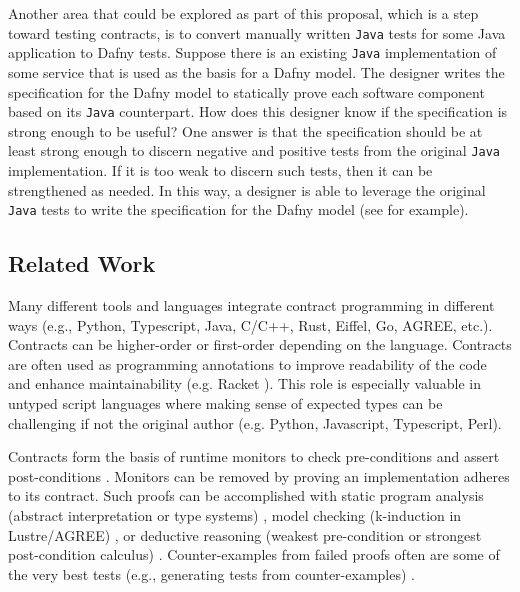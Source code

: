 \documentclass[11pt,onecolumn,notitlepage]{article}
\begin{document}
Another area that could be explored as part of this proposal, which is a step toward testing contracts, is to convert manually written \texttt{Java} tests for some Java application to Dafny tests. Suppose there is an existing \texttt{Java} implementation of some service that is used as the basis for a Dafny model. The designer writes the specification for the Dafny model to statically prove each software component based on its \texttt{Java} counterpart. How does this designer know if the specification is strong enough to be useful? One answer is that the specification should be at least strong enough to discern negative and positive tests from the original \texttt{Java} implementation. If it is too weak to discern such tests, then it can be strengthened as needed. In this way, a designer is able to leverage the original \texttt{Java} tests to write the specification for the Dafny model (see \cite{repo} for example).
 
\subsection*{Related Work}

Many different tools and languages integrate contract programming in different ways (e.g., Python, Typescript, Java, C/C++, Rust, Eiffel, Go, AGREE, etc.). Contracts can be higher-order or first-order depending on the language. Contracts are often used as programming annotations to improve readability of the code and enhance maintainability (e.g. Racket \cite{10.1145/3022670.2951930,10.1145/583852.581484,10.1145/2034574.2034800}). This role is especially valuable in untyped script languages where making sense of expected types can be challenging if not the original author (e.g. Python, Javascript, Typescript, Perl). 

Contracts form the basis of runtime monitors to check pre-conditions and assert post-conditions \cite{10.1007/978-3-642-28869-2_11}. Monitors can be removed by proving an implementation adheres to its contract. Such proofs can be accomplished with static program analysis (abstract interpretation or type systems) \cite{10.1145/3158139}, model checking (k-induction in Lustre/AGREE) \cite{10.1007/978-3-642-23702-7_26,10.1007/978-3-319-96142-2_3, 10.1007/978-3-642-28891-3_13, 10.1007/3-540-48249-0_34, 10.1007/978-3-319-41540-6_29}, or deductive reasoning (weakest pre-condition or strongest post-condition calculus) \cite{10.1007/3-540-45314-8_21, Huisman2016, 10.1007/978-3-642-27705-4_7, DBLP:series/lncs/10001, 10.1007/978-3-030-03421-4_4}. Counter-examples from failed proofs often are some of the very best tests (e.g., generating tests from counter-examples) \cite{Billeter:Thesis:2008}.
\end{document}
